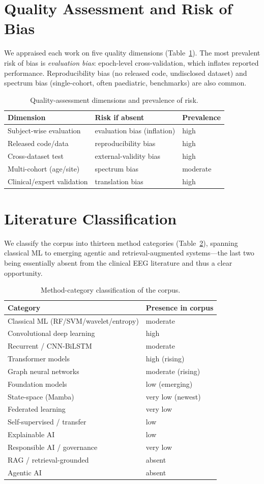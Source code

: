 \section{Quality Assessment and Risk of Bias}
We appraised each work on five quality dimensions (Table~\ref{tab:qa}). The most prevalent risk of bias is \emph{evaluation bias}: epoch-level cross-validation, which inflates reported performance. Reproducibility bias (no released code, undisclosed dataset) and spectrum bias (single-cohort, often paediatric, benchmarks) are also common.
\begin{table}[t]\centering\caption{Quality-assessment dimensions and prevalence of risk.}\label{tab:qa}
\footnotesize\begin{tabular}{lll}\toprule
Dimension & Risk if absent & Prevalence\\\midrule
Subject-wise evaluation & evaluation bias (inflation) & high\\
Released code/data & reproducibility bias & high\\
Cross-dataset test & external-validity bias & high\\
Multi-cohort (age/site) & spectrum bias & moderate\\
Clinical/expert validation & translation bias & high\\\bottomrule
\end{tabular}\end{table}

\section{Literature Classification}
We classify the corpus into thirteen method categories (Table~\ref{tab:class}), spanning classical ML to emerging agentic and retrieval-augmented systems---the last two being essentially absent from the clinical EEG literature and thus a clear opportunity.
\begin{table}[t]\centering\caption{Method-category classification of the corpus.}\label{tab:class}
\footnotesize\begin{tabular}{ll}\toprule
Category & Presence in corpus\\\midrule
Classical ML (RF/SVM/wavelet/entropy) & moderate\\
Convolutional deep learning & high\\
Recurrent / CNN-BiLSTM & moderate\\
Transformer models & high (rising)\\
Graph neural networks & moderate (rising)\\
Foundation models & low (emerging)\\
State-space (Mamba) & very low (newest)\\
Federated learning & very low\\
Self-supervised / transfer & low\\
Explainable AI & low\\
Responsible AI / governance & very low\\
RAG / retrieval-grounded & absent\\
Agentic AI & absent\\\bottomrule
\end{tabular}\end{table}


